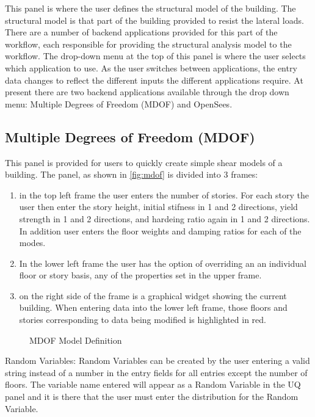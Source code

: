 This panel is where the user defines the structural model of the
building. The structural model is that part of the building provided
to resist the lateral loads. There are a number of backend
applications provided for this part of the workflow, each responsible
for providing the structural analysis model to the workflow. The
drop-down menu at the top of this panel is where the user selects
which application to use. As the user switches between applications,
the entry data changes to reflect the different inputs the different
applications require. At present there are two backend applications
available through the drop down menu: Multiple Degrees of Freedom
(MDOF) and OpenSees.

\subsection{Multiple Degrees of Freedom (MDOF)}

This panel is provided for users to quickly create simple shear models
of a building. The panel, as shown in \autoref{fig:mdof} is divided
into 3 frames:
\begin{enumerate}
\item in the top left frame the user enters the number of stories. For
  each story the user then enter the story height, initial stifness in
  1 and 2 directions, yield strength in 1 and 2 directions, and
  hardeing ratio again in 1 and 2 directions. In addition user enters
  the floor weights and damping ratios for each of the modes.
\item In the lower left frame the user has the option of overriding an
  an individual floor or story basis, any of the properties set in the
  upper frame.
\item on the right side of the frame is a graphical widget showing the
  current building. When entering data into the lower left frame,
  those floors and stories corresponding to data being modified is
  highlighted in red.
\end{enumerate}

\begin{figure}[!htbp]
  \caption{MDOF Model Definition}
  \label{fig:mdof}
\end{figure}

Random Variables: Random Variables can be created by the user entering
a valid string instead of a number in the entry fields for all entries
except the number of floors. The variable name entered will appear as
a Random Variable in the UQ panel and it is there that the user must
enter the distribution for the Random Variable.


